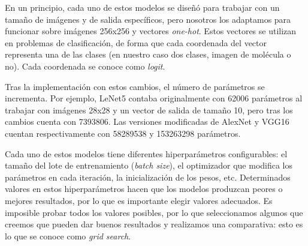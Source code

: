 En un principio, cada uno de estos modelos se diseñó para trabajar con un tamaño de imágenes y de salida específicos, pero nosotros los adaptamos para funcionar sobre imágenes 256x256 y vectores \textit{one-hot}. Estos vectores se utilizan en problemas de clasificación, de forma que cada coordenada del vector representa una de las clases (en nuestro caso dos clases, imagen de molécula o no). Cada coordenada se conoce como \textit{logit}.

Tras la implementación con estos cambios, el número de parámetros se incrementa. Por ejemplo, LeNet5 contaba originalmente con 62006 parámetros al trabajar con imágenes 28x28 y un vector de salida de tamaño 10, pero tras los cambios cuenta con 7393806. Las versiones modificadas de AlexNet y VGG16 cuentan respectivamente con 58289538 y 153263298 parámetros.

Cada uno de estos modelos tiene diferentes hiperparámetros configurables: el tamaño del lote de entrenamiento (\textit{batch size}), el optimizador que modifica los parámetros en cada iteración, la inicialización de los pesos, etc. Determinados valores en estos hiperparámetros hacen que los modelos produzcan peores o mejores resultados, por lo que es importante elegir valores adecuados. Es imposible probar todos los valores posibles, por lo que seleccionamos algunos que creemos que pueden dar buenos resultados y realizamos una comparativa: esto es lo que se conoce como \textit{grid search}.

